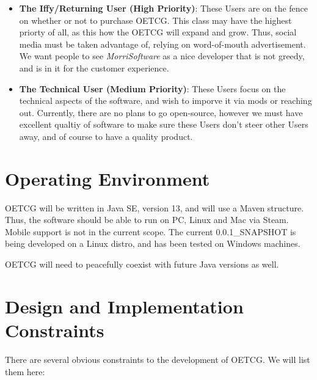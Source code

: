 \documentclass{scrreprt}
\def\myversion{0.0.1}
\def\orgname{\textit{MorriSoftware} }
\begin{document}
\begin{itemize}
	\item \textbf{The Iffy/Returning User (High Priority)}: These Users are on the fence on whether or not to purchase OETCG. This class may have the highest priorty of all, as this how the OETCG will expand and grow. Thus, social media must be taken advantage of, relying on word-of-mouth advertisement. We want people to see \orgname as a nice developer that is not greedy, and is in it for the customer experience.
	\item \textbf{The Technical User (Medium Priority)}: These Users focus on the technical aspects of the software, and wish to imporve it via mods or reaching out. Currently, there are no plans to go open-source, however we must have excellent qualtiy of software to make sure these Users don't steer other Users away, and of course to have a quality product.
\end{itemize}

\section{Operating Environment}
OETCG will be written in Java SE, version 13, and will use a Maven structure. Thus, the software should be able to run on PC, Linux and Mac via Steam. Mobile support is not in the current scope. The current \myversion\_SNAPSHOT is being developed on a Linux distro, and has been tested on Windows machines.

OETCG will need to peacefully coexist with future Java versions as well.

\section{Design and Implementation Constraints}
There are several obvious constraints to the development of OETCG. We will list them here:
\end{document}
